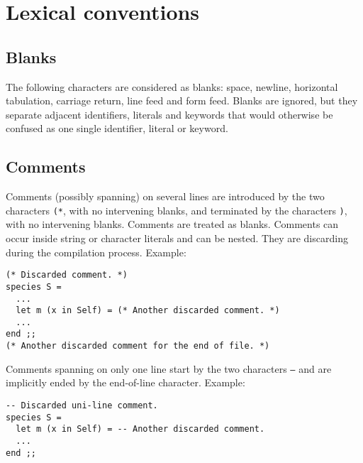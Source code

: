 \section{Lexical conventions}



\subsection{Blanks}
The following characters are considered as blanks: space, newline,
horizontal tabulation, carriage return, line feed and form
feed. Blanks are ignored, but they separate adjacent identifiers,
literals and keywords that would otherwise be confused as one single
identifier, literal or keyword.



\subsection{Comments}
Comments (possibly spanning) on several lines are introduced by the
two characters {\tt (*}, with no intervening blanks, and terminated by
the characters {\tt *)}, with no intervening blanks. Comments are
treated as blanks. Comments can occur inside string or character
literals and can be nested. They are discarding during the compilation
process. Example:
{\scriptsize
\begin{lstlisting}
(* Discarded comment. *)
species S =
  ...
  let m (x in Self) = (* Another discarded comment. *)
  ...
end ;;
(* Another discarded comment for the end of file. *)
\end{lstlisting}
}


Comments spanning on only one line start by the two characters
{\tt --} and are implicitly ended by the end-of-line character.
Example:
{\scriptsize
\begin{lstlisting}
-- Discarded uni-line comment.
species S =
  let m (x in Self) = -- Another discarded comment.
  ...
end ;;
\end{lstlisting}
}



